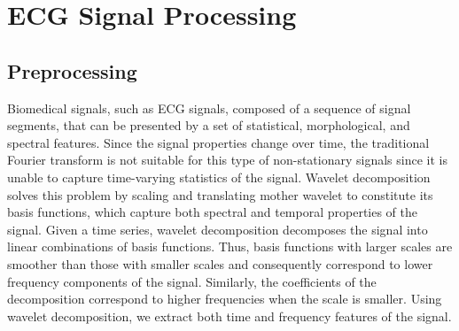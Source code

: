 
\section{ECG Signal Processing}

\subsection{Preprocessing}
Biomedical signals, such as ECG signals, composed of a sequence of signal segments, that can be presented by a set of statistical, morphological, and spectral features. Since the signal properties change over time, the traditional Fourier transform is not suitable for this type of non-stationary signals since it is unable to capture time-varying statistics of the signal. Wavelet decomposition solves this problem by scaling and translating mother wavelet to constitute its basis functions, which capture both spectral and temporal properties of the signal. Given a time series, wavelet decomposition decomposes the signal into linear combinations of basis functions. Thus, basis functions with larger scales are smoother than those with smaller scales and consequently correspond to lower frequency components of the signal. Similarly, the coefficients of the decomposition correspond to higher frequencies when the scale is smaller. Using wavelet decomposition, we extract both time and frequency features of the signal.



